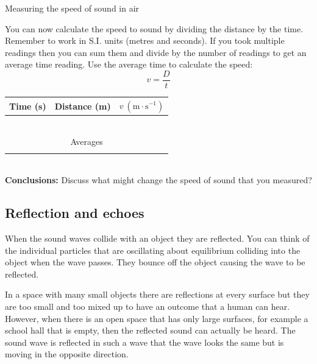 \begin{i_experiment}{Measuring the speed of sound in air}
\begin{minipage}{.45\textwidth}
You can now calculate the speed to sound by dividing the distance by the time. Remember to work in S.I. units (metres and seconds). If you took multiple readings then you can sum them and divide by the number of readings to get an average time reading. Use the average time to calculate the speed:
\begin{equation*}
 v = \frac{D}{t}
\end{equation*} 
\end{minipage}\hspace{.03\textwidth}
\begin{minipage}{.5\textwidth}
\begin{table}[H]
 \begin{tabular}{|c|c|c|}\hline\hline
Time (s) & Distance (m) & $v~(\text{m}\cdot\text{s}^{-1})$ \\\hline
 & & \\\hline 
 & & \\\hline 
 & & \\\hline 
 & & \\\hline 
 & & \\\hline 
 & & \\\hline \hline
\multicolumn{3}{|c|}{Averages} \\ \hline
 & & \\\hline 
 \end{tabular}
\end{table}
\end{minipage}\\
\textbf{Conclusions:}
Discuss what might change the speed of sound that you measured? 
\end{i_experiment}

\subsection{Reflection and echoes}

When the sound waves collide with an object they are reflected. You can think of the individual particles that are oscillating about equilibrium colliding into the object when the wave passes. They bounce off the object causing the wave to be reflected.

In a space with many small objects there are reflections at every surface but they are too small and too mixed up to have an outcome that a human can hear. However, when there is an open space that has only large surfaces, for example a school hall that is empty, then the reflected sound can actually be heard. The sound wave is reflected in such a wave that the wave looks the same but is moving in the opposite direction.

